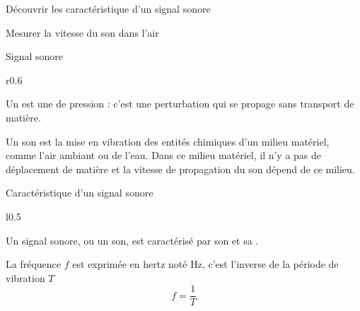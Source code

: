 \sndEnTeteSept
{}

\vspace*{-24pt}


\begin{objectifs}
  \item Découvrir les caractéristique d'un signal sonore
  \item Mesurer la vitesse du son dans l'air
\end{objectifs}


\begin{doc}{Signal sonore}
  \vspace*{-36pt}
  \begin{wrapfigure}[5]{r}{0.6\linewidth}
    \vspace*{-28pt}
    \begin{center}
    \end{center}
  \end{wrapfigure}
  \begin{encart}
    Un  est une  de pression : c'est une perturbation qui se propage sans transport de matière.
  \end{encart}
  Un son est la mise en vibration des entités chimiques d'un milieu matériel, comme l'air ambiant ou de l'eau. 
  Dans ce milieu matériel, il n'y a pas de déplacement de matière et la vitesse de propagation du son dépend de ce milieu.
\end{doc}


\begin{doc}{Caractéristique d'un signal sonore}
  \vspace*{10pt}
  \begin{wrapfigure}[3]{l}{0.5\linewidth}
    \vspace*{-60pt}
    \begin{center}
    \end{center}
  \end{wrapfigure}
  Un signal sonore, ou un son, est caractérisé par son  et sa .
  
  \vspace*{40pt}
  \begin{encart}
    La fréquence $f$ est exprimée en hertz noté Hz, c'est l'inverse de la période de vibration $T$
    \begin{equation*}
      f = \frac{1}{T}
    \end{equation*}
  \end{encart}
\end{doc}


